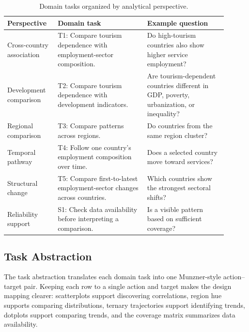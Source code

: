 \documentclass{vgtc}
\begin{document}
\begin{table}[t]
    \centering
    \caption{Domain tasks organized by analytical perspective.}
    \label{tab:domain-tasks}
    \footnotesize
    \setlength{\tabcolsep}{3pt}
    \renewcommand{\arraystretch}{1.12}
    \begin{tabular}{p{0.20\linewidth} p{0.37\linewidth} p{0.33\linewidth}}
        \toprule
        \textbf{Perspective} & \textbf{Domain task} & \textbf{Example question} \\
        \midrule
        Cross-country association & T1: Compare tourism dependence with employment-sector composition. & Do high-tourism countries also show higher service employment? \\
        Development comparison & T2: Compare tourism dependence with development indicators. & Are tourism-dependent countries different in GDP, poverty, urbanization, or inequality? \\
        Regional comparison & T3: Compare patterns across regions. & Do countries from the same region cluster? \\
        Temporal pathway & T4: Follow one country's employment composition over time. & Does a selected country move toward services? \\
        Structural change & T5: Compare first-to-latest employment-sector changes across countries. & Which countries show the strongest sectoral shifts? \\
        Reliability support & S1: Check data availability before interpreting a comparison. & Is a visible pattern based on sufficient coverage? \\
        \bottomrule
    \end{tabular}
\end{table}

\subsection{Task Abstraction}

The task abstraction translates each domain task into one Munzner-style action--target pair. Keeping each row to a single action and target makes the design mapping clearer: scatterplots support discovering correlations, region hue supports comparing distributions, ternary trajectories support identifying trends, dotplots support comparing trends, and the coverage matrix summarizes data availability.
\end{document}
